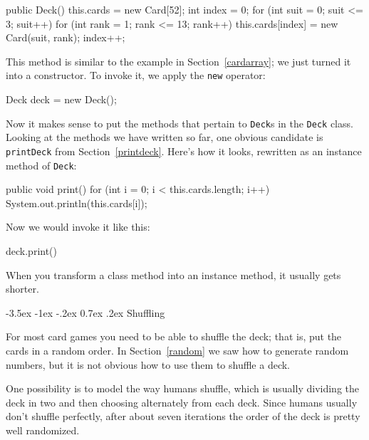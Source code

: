 \documentclass[12pt]{book}
\makeatletter
\theoremstyle{exercise}
\newcommand{\java}[1]{\verb"#1"}
\renewcommand{\section}{\@startsection{section}{1}{\z@}%
    {-3.5ex \@plus -1ex \@minus -.2ex}%
    {0.7ex \@plus.2ex}%
    {\normalfont\Large\bfseries}}
\newcommand{\java}[1]{\lstinline{#1}} %
\makeatother
\begin{document}
\begin{code}
    public Deck() {
        this.cards = new Card[52];
        int index = 0;
        for (int suit = 0; suit <= 3; suit++) {
            for (int rank = 1; rank <= 13; rank++) {
                this.cards[index] = new Card(suit, rank);
                index++;
            }
        }
    }
\end{code}


This method is similar to the example in Section~\ref{cardarray}; we just turned it into a constructor.
To invoke it, we apply the \java{new} operator:

\begin{code}
    Deck deck = new Deck();
\end{code}


Now it makes sense to put the methods that pertain to \java{Deck}s in the \java{Deck} class.
Looking at the methods we have written so far, one obvious candidate is \java{printDeck} from Section~\ref{printdeck}.
Here's how it looks, rewritten as an instance method of \java{Deck}:

\begin{code}
    public void print() {
        for (int i = 0; i < this.cards.length; i++) {
            System.out.println(this.cards[i]);
        }
    }
\end{code}

Now we would invoke it like this:

\begin{code}
    deck.print()
\end{code}

When you transform a class method into an instance method, it usually gets shorter.



\section{Shuffling}
\label{shuffle}


For most card games you need to be able to shuffle the deck; that is, put the cards in a random order.
In Section~\ref{random} we saw how to generate random numbers, but it is not obvious how to use them to shuffle a deck.

One possibility is to model the way humans shuffle, which is usually dividing the deck in two and then choosing alternately from each deck.
Since humans usually don't shuffle perfectly, after about seven iterations the order of the deck is pretty well randomized.
\end{document}
